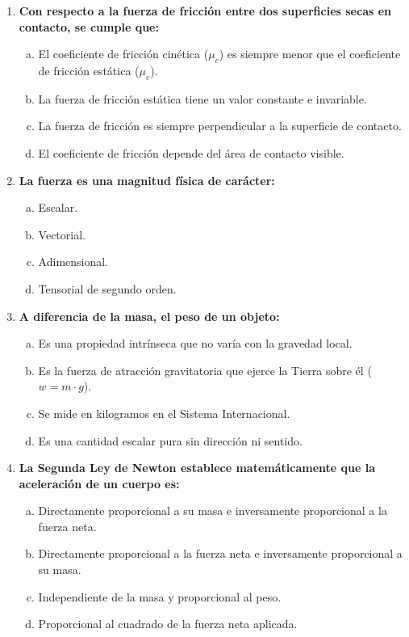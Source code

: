 \documentclass[11pt,a4paper]{article}
\begin{document}
\begin{enumerate}
    \item \textbf{Con respecto a la fuerza de fricción entre dos superficies secas en contacto, se cumple que:}
    \begin{enumerate}[a)]
        \item El coeficiente de fricción cinética ($\mu_c$) es siempre menor que el coeficiente de fricción estática ($\mu_e$).
        \item La fuerza de fricción estática tiene un valor constante e invariable.
        \item La fuerza de fricción es siempre perpendicular a la superficie de contacto.
        \item El coeficiente de fricción depende del área de contacto visible.
    \end{enumerate}

    \item \textbf{La fuerza es una magnitud física de carácter:}
    \begin{enumerate}[a)]
        \item Escalar.
        \item Vectorial.
        \item Adimensional.
        \item Tensorial de segundo orden.
    \end{enumerate}

    \item \textbf{A diferencia de la masa, el peso de un objeto:}
    \begin{enumerate}[a)]
        \item Es una propiedad intrínseca que no varía con la gravedad local.
        \item Es la fuerza de atracción gravitatoria que ejerce la Tierra sobre él ($w = m \cdot g$).
        \item Se mide en kilogramos en el Sistema Internacional.
        \item Es una cantidad escalar pura sin dirección ni sentido.
    \end{enumerate}

    \item \textbf{La Segunda Ley de Newton establece matemáticamente que la aceleración de un cuerpo es:}
    \begin{enumerate}[a)]
        \item Directamente proporcional a su masa e inversamente proporcional a la fuerza neta.
        \item Directamente proporcional a la fuerza neta e inversamente proporcional a su masa.
        \item Independiente de la masa y proporcional al peso.
        \item Proporcional al cuadrado de la fuerza neta aplicada.
    \end{enumerate}

\end{enumerate}
\end{document}
